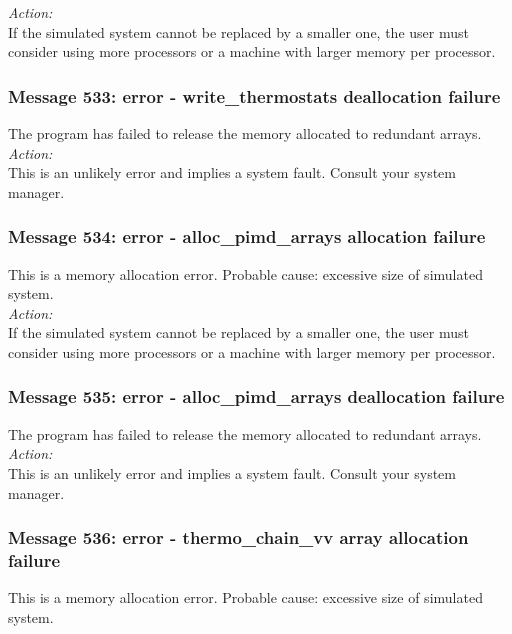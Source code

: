 \noindent
{\em Action:}\\
If the simulated system cannot be replaced by a smaller one, the user
must consider using more processors or a machine with larger memory
per processor.

\subsubsection*{Message 533: error - write\_thermostats deallocation failure}

The program has failed to release the memory allocated to redundant arrays.\\

\noindent
{\em Action:}\\
This is an unlikely error and implies a system fault. Consult your system manager.

\subsubsection*{Message 534: error - alloc\_pimd\_arrays allocation failure}

This is a memory allocation error. Probable cause: excessive size of
simulated system. \\

\noindent
{\em Action:}\\
If the simulated system cannot be replaced by a smaller one, the user
must consider using more processors or a machine with larger memory
per processor.

\subsubsection*{Message 535: error - alloc\_pimd\_arrays deallocation failure}

The program has failed to release the memory allocated to redundant arrays.\\

\noindent
{\em Action:}\\
This is an unlikely error and implies a system fault. Consult your system manager.

\subsubsection*{Message 536: error - thermo\_chain\_vv array allocation failure}

This is a memory allocation error. Probable cause: excessive size of
simulated system. \\

